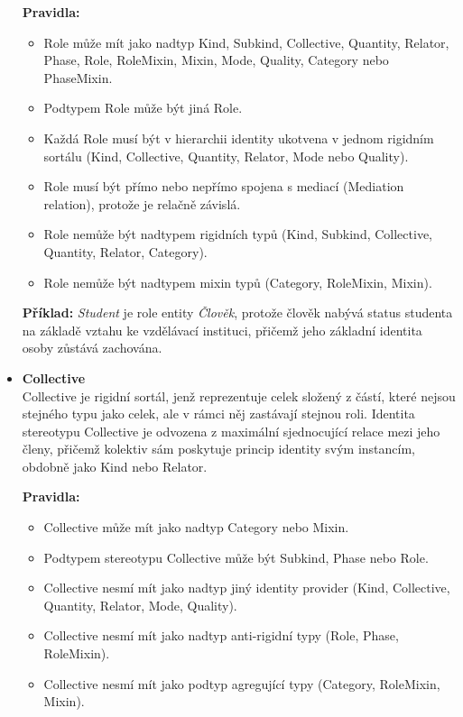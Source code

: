 \begin{itemize}
  \textbf{Pravidla:}
  \begin{itemize}
    \item Role může mít jako nadtyp Kind, Subkind, Collective, Quantity, Relator, Phase, Role, RoleMixin, Mixin, Mode, Quality, Category nebo PhaseMixin.
    \item Podtypem Role může být jiná Role.
    \item Každá Role musí být v hierarchii identity ukotvena v jednom rigidním sortálu (Kind, Collective, Quantity, Relator, Mode nebo Quality).
    \item Role musí být přímo nebo nepřímo spojena s mediací (Mediation relation), protože je relačně závislá.
    \item Role nemůže být nadtypem rigidních typů (Kind, Subkind, Collective, Quantity, Relator, Category).
    \item Role nemůže být nadtypem mixin typů (Category, RoleMixin, Mixin). \cite{ontouml_class_stereotypes} 
  \end{itemize}

  \textbf{Příklad:} \textit{Student} je role entity \textit{Člověk}, protože člověk nabývá status studenta na základě vztahu ke vzdělávací instituci, přičemž jeho základní identita osoby zůstává zachována.


  \item \textbf{Collective} \\
  Collective je rigidní sortál, jenž reprezentuje celek složený z částí, které nejsou stejného typu jako celek, ale v rámci něj zastávají stejnou roli. Identita stereotypu Collective je odvozena z maximální sjednocující relace mezi jeho členy, přičemž kolektiv sám poskytuje princip identity svým instancím, obdobně jako Kind nebo Relator. \cite{KOM_prezentace4,ontouml_class_stereotypes}

  \textbf{Pravidla:}
  \begin{itemize}
    \item Collective může mít jako nadtyp Category nebo Mixin.
    \item Podtypem stereotypu Collective může být Subkind, Phase nebo Role.
    \item Collective nesmí mít jako nadtyp jiný identity provider (Kind, Collective, Quantity, Relator, Mode, Quality).
    \item Collective nesmí mít jako nadtyp anti-rigidní typy (Role, Phase, RoleMixin).
    \item Collective nesmí mít jako podtyp agregující typy (Category, RoleMixin, Mixin). \cite{ontouml_class_stereotypes}
  \end{itemize}


\end{itemize}
